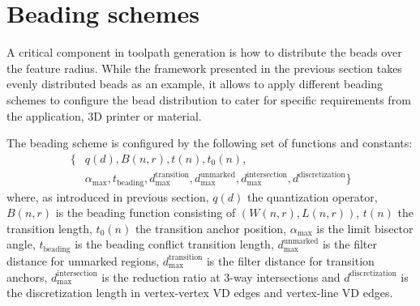 \section{Beading schemes}\label{sec_generalization}
A critical component in toolpath generation is how to distribute the beads over the feature radius.
While the framework presented in the previous section takes evenly distributed beads as an example, it allows to apply different beading schemes to configure the bead distribution to cater for specific requirements from the application, 3D printer or material.



\begin{definition}\label{beading_scheme_definition}
The beading scheme is configured by the following set of functions and constants:
\begin{align*}
\{
&q(d),
B(n, r),
t(n),
t_0(n),
\\
&\alpha_\text{max}, 
t_\text{beading}, 
d_\text{max}^\text{transition}, 
d_\text{max}^\text{unmarked}, 
d_\text{max}^\text{intersection},
d^\text{discretization}
 \}
\end{align*}
where, as introduced in previous section,
$q(d)$ the quantization operator,
$B(n,r)$ is the beading function consisting of $\left( W(n,r), L(n,r) \right)$,
$t(n)$ the transition length,
$t_0(n)$ the transition anchor position,
$\alpha_{\text{max}}$ is the limit bisector angle,
$t_\text{beading}$ is the beading conflict transition length,
$d_\text{max}^\text{unmarked}$ is the filter distance for unmarked regions,
$d_\text{max}^\text{transition}$ is the filter distance for transition anchors,
$d_\text{max}^\text{intersection}$ is the reduction ratio at 3-way intersections
and
$d^\text{discretization}$ is the discretization length in vertex-vertex VD edges and vertex-line VD edges.
\end{definition}



